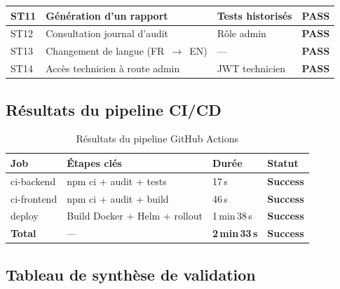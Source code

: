 \begin{table}[H]
\begin{tabularx}{\textwidth}{|C{1.2cm}|X|L{3.8cm}|L{2.2cm}|}
    \hline
    ST11 & Génération d'un rapport          & Tests historisés           & \textcolor{vertCode}{\textbf{PASS}} \\
    \hline
    ST12 & Consultation journal d'audit     & Rôle admin                & \textcolor{vertCode}{\textbf{PASS}} \\
    \hline
    ST13 & Changement de langue (FR~$\to$~EN) & ---                     & \textcolor{vertCode}{\textbf{PASS}} \\
    \hline
    ST14 & Accès technicien à route admin   & JWT technicien            & \textcolor{vertCode}{\textbf{PASS}} \\
    \hline
  \end{tabularx}
\end{table}

\subsection{Résultats du pipeline CI/CD}

\begin{table}[H]
  \centering
  \caption{Résultats du pipeline GitHub Actions}
  \label{tab:cicd_results}
  \begin{tabularx}{\textwidth}{|L{2.5cm}|X|L{2.8cm}|L{2.5cm}|}
    \hline
    \textbf{Job} & \textbf{Étapes clés} & \textbf{Durée} & \textbf{Statut} \\
    \hline
    ci-backend  & npm ci + audit + tests        & 17\,s         & \textcolor{vertCode}{\textbf{Success}} \\
    \hline
    ci-frontend & npm ci + audit + build        & 46\,s         & \textcolor{vertCode}{\textbf{Success}} \\
    \hline
    deploy      & Build Docker + Helm + rollout & 1\,min\,38\,s & \textcolor{vertCode}{\textbf{Success}} \\
    \hline
    \textbf{Total} & --- & \textbf{2\,min\,33\,s} & \textcolor{vertCode}{\textbf{Success}} \\
    \hline
  \end{tabularx}
\end{table}

\subsection{Tableau de synthèse de validation}


